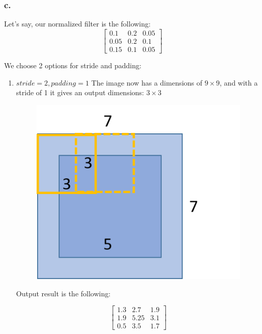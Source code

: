 \documentclass[a4paper]{iacas}
\begin{document}
\subsubsection{c.}
Let's say, our normalized filter is the following:
\begin{equation*}
\left[
\begin{matrix}
0.1 & 0.2 & 0. 05 \\
0.05 & 0.2 & 0.1 \\
0.15 & 0.1 & 0.05
\end{matrix}
\right]
\end{equation*}

We choose 2 options for stride and padding:

\begin{enumerate}
\item $stride = 2, padding = 1$
The image now has a dimensions of $9\times9$, and with a stride of 1 it gives an output dimensions: $3\times3$
\vskip 0.1in
\begin{figure}
	\includegraphics[scale=0.8]{imgs/q_1_31.png}
\end{figure}
\vskip 0.1in

Output result is the following:

\begin{equation*}
\left[
\begin{matrix}
1.3 & 2.7 & 1.9 \\
1.9 & 5.25 & 3.1 \\
0.5 & 3.5 & 1.7
\end{matrix}
\right]
\end{equation*}



\end{enumerate}
\end{document}
